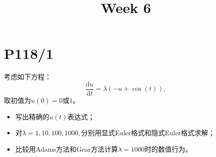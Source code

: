 \documentclass{homework}
\title{Week 6}
\date{}
\begin{document}
\maketitle
\section{P118/1}
考虑如下方程：$$\frac{\mathrm{d}u}{\mathrm{d}t}=\lambda(-u+\cos(t)),$$取初值为$u(0)=0$或$1$。
\begin{itemize}
    \item 写出精确的$u(t)$表达式；
    \item 对$\lambda=1,10,100,1000,$分别用显式Euler格式和隐式Euler格式求解；
    \item 比较用Adams方法和Gear方法计算$\lambda=1000$时的数值行为。
\end{itemize}
\end{document}
